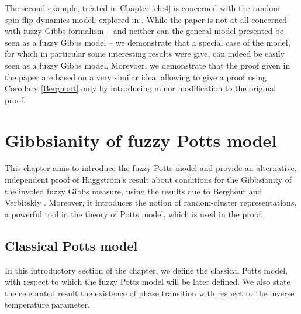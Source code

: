 \documentclass[12pt]{article}
\newcommand{\1}{\mathbbm{1}}
\newcommand{\5}{\vspace{0.5cm}}
\theoremstyle{definition}
\begin{document}
The second example, treated in Chapter \ref{ch:4} is concerned with the random spin-flip dynamics model, explored in \cite{EFHR}. While the paper is not at all concerned with fuzzy Gibbs formalism -- and neither can the general model presented be seen as a fuzzy Gibbs model -- we demonstrate that a special case of the model, for which in particular some interesting results were give, can indeed be easily seen as a fuzzy Gibbs model. Morevoer, we demonstrate that the proof given in the paper are based on a very similar idea, allowing to give a proof using Corollary \ref{Berghout} only by introducing minor modification to the original proof.


\pagebreak


\section{Gibbsianity of fuzzy Potts model}\label{ch:3}

This chapter aims to introduce the fuzzy Potts model and provide an alternative, independent proof of H\"aggstr\"om's result \cite{Hag} about conditions for the Gibbsianity of the involed fuzzy Gibbs measure, using the results due to Berghout and Verbitskiy \cite{Ber}. Moreover, it introduces the notion of random-cluster representations, a powerful tool in the theory of Potts model, which is used in the proof.


\subsection{Classical Potts model}

In this introductory section of the chapter, we define the classical Potts model, with respect to which the fuzzy Potts model will be later defined. We also state the celebrated result the existence of phase transition with respect to the inverse temperature parameter. \\
\end{document}
